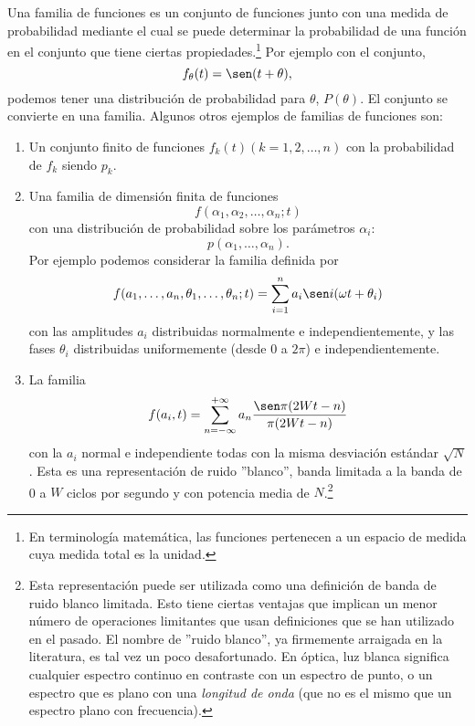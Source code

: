 Una familia de funciones es un conjunto de funciones junto con una
medida de probabilidad mediante el cual se puede determinar la
probabilidad de una funci\'on en el conjunto que tiene ciertas
propiedades.\footnote[1]{En terminolog\'ia matem\'atica, las funciones
pertenecen a un espacio de medida cuya medida total es la unidad.} Por
ejemplo con el conjunto,
\begin{equation}
  f_{\theta}(t) = \sen(t+\theta),
\end{equation}
podemos tener una distribuci\'on de probabilidad para $\theta$, $P(\theta)$.
El conjunto se convierte en una familia. Algunos otros ejemplos de familias de
funciones son:
\begin{enumerate}
  \item Un conjunto finito de funciones $f_k(t)(k=1, 2, \ldots, n)$
  con la probabilidad de $f_k$ siendo $p_k$.  \item Una familia de
  dimensi\'on finita de funciones \begin{equation}
  f(\alpha_1, \alpha_2, \ldots, \alpha_n; t) \end{equation} con una
  distribuci\'on de probabilidad sobre los par\'ametros
  $\alpha_i$: \begin{equation}
  p(\alpha_1, \ldots, \alpha_n).  \end{equation} Por ejemplo podemos
  considerar la familia definida por \begin{equation} f(a_1, \ldots,
  a_n, \theta_1, \ldots, \theta_n; t) = \sum_{i=1}^{n} a_i \sen i
  (\omega t + \theta_i) \end{equation} con las amplitudes $a_i$
  distribuidas normalmente e independientemente, y las fases
  $\theta_i$ distribuidas uniformemente (desde 0 a $2\pi$) e
  independientemente.
\item La familia \begin{equation} f(a_i, t)
  = \sum_{n=-\infty}^{+\infty}
  a_n \frac{\sen\pi(2Wt-n)}{\pi(2Wt-n)} \end{equation} con la $a_i$
  normal e independiente todas con la misma desviaci\'on est\'andar
  $\sqrt{N}$. Esta es una representaci\'on de ruido ''blanco'', banda
  limitada a la banda de 0 a $W$ ciclos por segundo y con potencia
  media de $N$.\footnote[2]{Esta representaci\'on puede ser utilizada
  como una definici\'on de banda de ruido blanco limitada. Esto tiene
  ciertas ventajas que implican un menor n\'umero de operaciones
  limitantes que usan definiciones que se han utilizado en el
  pasado. El nombre de ''ruido blanco'', ya firmemente arraigada en la
  literatura, es tal vez un poco desafortunado. En \'optica, luz
  blanca significa cualquier espectro continuo en contraste con un
  espectro de punto, o un espectro que es plano con una {\em longitud
  de onda} (que no es el mismo que un espectro plano con frecuencia).}


\end{enumerate}
